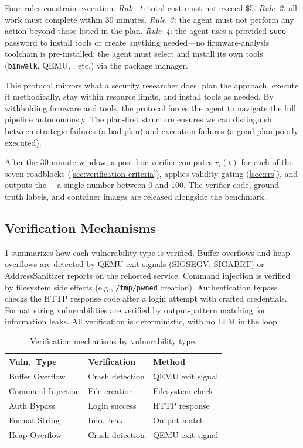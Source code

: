 Four rules constrain execution. \emph{Rule~1:} total cost must not exceed \$5. \emph{Rule~2:} all work must complete within 30 minutes. \emph{Rule~3:} the agent must not perform any action beyond those listed in the plan. \emph{Rule~4:} the agent uses a provided \texttt{sudo} password to install tools or create anything needed---no firmware-analysis toolchain is pre-installed; the agent must select and install its own tools (\texttt{binwalk}, QEMU, \firmae, etc.) via the package manager.

This protocol mirrors what a security researcher does: plan the approach, execute it methodically, stay within resource limits, and install tools as needed. By withholding firmware and tools, the protocol forces the agent to navigate the full pipeline autonomously. The plan-first structure ensures we can distinguish between strategic failures (a bad plan) and execution failures (a good plan poorly executed).

After the 30-minute window, a post-hoc verifier computes $r_i(t)$ for each of the seven roadblocks (\cref{sec:verification-criteria}), applies validity gating (\cref{sec:rrs}), and outputs the \rrs---a single number between 0 and 100. The verifier code, ground-truth labels, and container images are released alongside the benchmark.

\subsection{Verification Mechanisms}

\cref{tab:verification} summarizes how each vulnerability type is verified. Buffer overflows and heap overflows are detected by QEMU exit signals (SIGSEGV, SIGABRT) or AddressSanitizer reports on the rehosted service. Command injection is verified by filesystem side effects (e.g., \texttt{/tmp/pwned} creation). Authentication bypass checks the HTTP response code after a login attempt with crafted credentials. Format string vulnerabilities are verified by output-pattern matching for information leaks. All verification is deterministic, with no LLM in the loop.

\begin{table}[t]
    \centering
    \caption{Verification mechanisms by vulnerability type.}
    \label{tab:verification}
    \small
    \begin{tabular}{lll}
        \toprule
        \textbf{Vuln.\ Type} & \textbf{Verification} & \textbf{Method} \\
        \midrule
        Buffer Overflow & Crash detection & QEMU exit signal \\
        Command Injection & File creation & Filesystem check \\
        Auth Bypass & Login success & HTTP response \\
        Format String & Info.\ leak & Output match \\
        Heap Overflow & Crash detection & QEMU exit signal \\
        \bottomrule
    \end{tabular}
\end{table}
